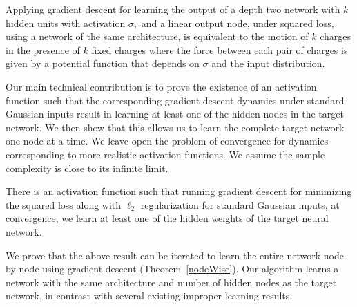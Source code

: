 \begin{theorem}
Applying gradient descent for learning the output of a depth two network
with $k$ hidden units with activation $\sigma,$ and a linear output
node, under squared loss, using a network of the same architecture,
is equivalent to the motion of $k$ charges in the presence of $k$ fixed charges where the force between each pair of charges is given by a potential function that depends on $\sigma$ and the input distribution.  \end{theorem}
%
Our main technical contribution is to prove the existence of an
activation function such that the corresponding gradient descent
dynamics under standard Gaussian inputs result in learning at least
one of the hidden nodes in the target network. We then show that this
allows us to learn the complete target network one node at a time. We
leave open the problem of convergence for dynamics corresponding to
more realistic activation functions. We assume the sample complexity
is close to its infinite limit.
%

%
\begin{theorem}
There is an activation function such that running gradient
  descent for minimizing the squared loss along with $\ell_2$
  regularization for standard Gaussian inputs, at convergence, 
  we learn at least one of
  the hidden weights of the target neural network.
\end{theorem}
%
We  prove that the above result can be iterated to learn the entire network node-by-node using gradient descent (Theorem~\ref{nodeWise}).  Our algorithm learns a network with the same architecture and number of hidden nodes as the target network, 
in contrast with several existing improper learning results.

